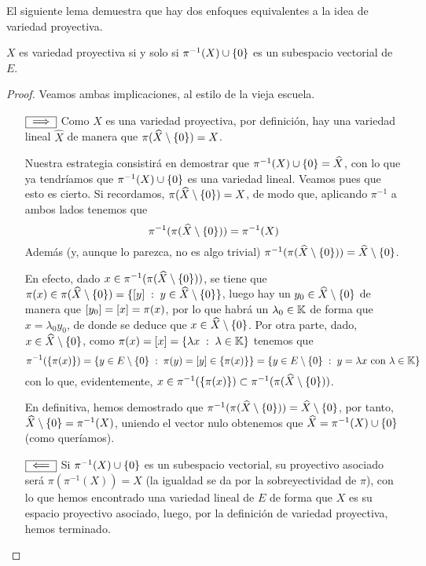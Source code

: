 El siguiente lema demuestra que hay dos enfoques equivalentes a la idea de variedad proyectiva.
\begin{lem}
	\label{epro_lem_caracterizacionVariedades}
	$X$ es variedad proyectiva si y solo si $\pi^{-1}(X)\cup\{0\}$ es un subespacio vectorial de $E$.
\end{lem}
\begin{proof} Veamos ambas implicaciones, al estilo de la vieja escuela.
\begin{itemize}
	\item[$\fbox{$\implies$}$]Como $X$ es una variedad proyectiva, por definición, hay una variedad lineal $\widehat{X}$ de manera que $\pi(\widehat{X}\setminus\{0\})=X$.
	
	Nuestra estrategia consistirá en demostrar que $\pi^{-1}(X)\cup\{0\}=\widehat{X}$, con lo que ya tendríamos que $\pi^{-1}(X)\cup\{0\}$ es una variedad lineal. Veamos pues que esto es cierto. Si recordamos, $\pi(\widehat{X}\setminus\{0\})=X$, de modo que, aplicando $\pi^{-1}$ a ambos lados tenemos que
	\begin{equation*}
		\pi^{-1}(\pi(\widehat{X}\setminus\{0\}))=\pi^{-1}(X)
	\end{equation*}
	Además (y, aunque lo parezca, no es algo trivial) $\pi^{-1}(\pi(\widehat{X}\setminus\{0\}))=\widehat{X}\setminus\{0\}$.
	
	En efecto, dado $x\in\pi^{-1}(\pi(\widehat{X}\setminus\{0\}))$, se tiene que $\pi(x)\in\pi(\widehat{X}\setminus\{0\})=\{\left [ y \right ]\;:\; y\in\widehat{X}\setminus\{0\}\}$, luego hay un $y_0\in\widehat{X}\setminus\{0\}$ de manera que $\left [ y_0 \right ]=\left [ x \right ]=\pi(x)$, por lo que habrá un $\lambda_0\in\mathbb{K}$ de forma que $x=\lambda_0y_0$, de donde se deduce que $x\in\widehat{X}\setminus\{0\}$. Por otra parte, dado, $x\in\widehat{X}\setminus\{0\}$, como $\pi(x)=\left [ x \right ]=\{\lambda x\;:\; \lambda\in\mathbb{K}\}$ tenemos que
	\begin{equation*}
		\pi^{-1}(\{\pi(x)\})= \{y\in E\setminus\{0\}\;:\;\pi(y)=\left [ y \right ]\in\{\pi(x)\}\}=\{y\in E\setminus\{0\}\;:\; y=\lambda x\text{ con }\lambda\in\mathbb{K}\}
	\end{equation*}
	con lo que, evidentemente, $x\in\pi^{-1}(\{\pi(x)\})\subset\pi^{-1}(\pi(\widehat{X}\setminus\{0\}))$.
	
	En definitiva, hemos demostrado que $\pi^{-1}(\pi(\widehat{X}\setminus\{0\}))=\widehat{X}\setminus\{0\}$, por tanto, $\widehat{X}\setminus\{0\}=\pi^{-1}(X)$, uniendo el vector nulo obtenemos que $\widehat{X}=\pi^{-1}(X)\cup\{0\}$ (como queríamos).
	\item[$\fbox{$\impliedby$}$] Si $\pi^{-1}(X)\cup\{0\}$ es un subespacio vectorial, su proyectivo asociado será $\pi(\pi^{-1}(X))=X$ (la igualdad se da por la sobreyectividad de $\pi$), con lo que hemos encontrado una variedad lineal de $E$ de forma que $X$ es su espacio proyectivo asociado, luego, por la definición de variedad proyectiva, hemos terminado.\qedhere
\end{itemize}
\end{proof}
